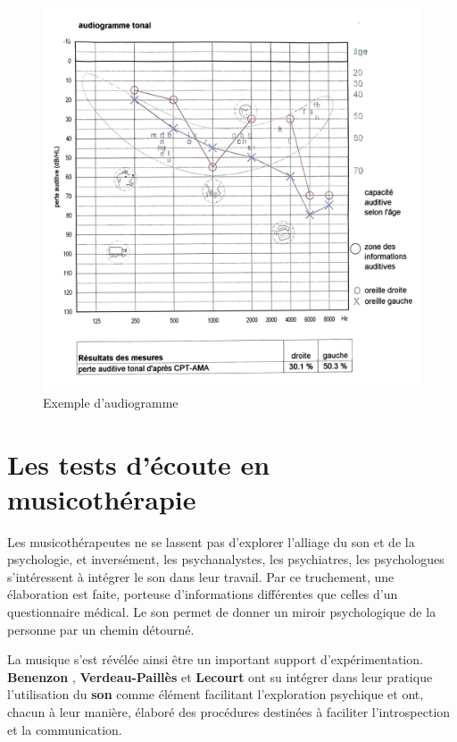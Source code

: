 \begin{figure}
	\centering
	\includegraphics[width=0.7\linewidth]{images/graphiques/exempleaudiogramme.png}
	\caption{Exemple d'audiogramme}
\label{audiogramme}
\end{figure}

\section{Les tests d'écoute en musicothérapie}
\label{musicothEtpsycho}
Les musicothérapeutes ne se lassent pas d'explorer l'alliage du son
 et de la psychologie, et inversément, les psychanalystes, les psychiatres, les psychologues
 s'intéressent à intégrer le son dans leur travail. Par ce truchement,
 une élaboration est faite, porteuse d'informations différentes que
 celles d'un questionnaire médical. Le son permet de donner un miroir
 psychologique de la personne par un chemin détourné.

La musique s'est révélée ainsi être un important support
         d'expérimentation.   \textbf{Benenzon} \autocite{benenzon:musicotherapie},\textbf{ Verdeau-Paillès} \autocite{verdeau-pailles:bilan} et
         \textbf{Lecourt }\autocite{lecourt_les_2017}
         ont su intégrer dans leur pratique l'utilisation du\textbf{ son }comme
         élément facilitant l'exploration psychique et
         ont, chacun à leur manière, élaboré des procédures destinées à faciliter
         l'introspection et la communication.


